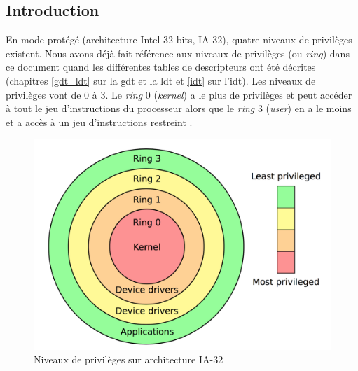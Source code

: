 \label{user}

\subsection{Introduction}
En mode protégé (architecture Intel 32 bits, \acrshort{IA-32}), quatre niveaux
de privilèges existent.
Nous avons déjà fait référence aux niveaux de privilèges (ou \textit{ring})
dans ce document quand les différentes tables de descripteurs ont été décrites
(chapitres \ref{gdt_ldt} sur la \acrshort{gdt} et la \acrshort{ldt} et \ref{idt}
sur l'\acrshort{idt}). Les niveaux de privilèges vont de 0 à 3. Le \textit{ring}
0 (\textit{kernel}) a le plus de privilèges et peut accéder à tout le jeu d'instructions
du processeur alors que le \textit{ring} 3 (\textit{user}) en a le moins et a accès
à un jeu d'instructions restreint \cite{ref42}.

\begin{figure}[!h]
  \centering
  \includegraphics[scale=.4]{images/rings.png}
  \caption{Niveaux de privilèges sur architecture \acrshort{IA-32}}
  \label{rings}
\end{figure}

